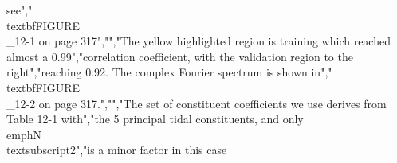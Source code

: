 {{{{{{{{{{see","\\textbf{FIGURE\\_12-1 on page 317}","","The yellow highlighted region is training which reached almost a 0.99","correlation coefficient, with the validation region to the right","reaching 0.92. The complex Fourier spectrum is shown in","\\textbf{FIGURE\\_12-2 on page 317.}","","The set of constituent coefficients we use derives from Table 12-1 with","the 5 principal tidal constituents, and only \\emph{N\\textsubscript{2}}","is a minor factor in this case }}}}}}}}}}
